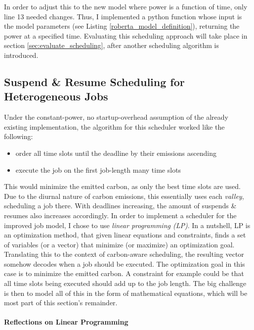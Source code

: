 In order to adjust this to the new model where power is a function of time, only line 13 needed changes. 
Thus, I implemented a python function whose input is the model parameters (see Listing \ref{roberta_model_definition}), returning the power at a specified time. 
Evaluating this scheduling approach will take place in section \ref{sec:evaluate_scheduling}, after another scheduling algorithm is introduced.

\subsection{{Suspend \& Resume Scheduling for Heterogeneous Jobs}} \label{sec:checkpoint_resume_lp}

Under the constant-power, no startup-overhead assumption of the already existing implementation, the algorithm for this scheduler worked like the following:

\begin{itemize}
    \item order all time slots until the deadline by their emissions ascending
    \item execute the job on the first job-length many time slots
\end{itemize}

This would minimize the emitted carbon, as only the best time slots are used.
Due to the diurnal nature of carbon emissions, this essentially uses each \emph{valley}, scheduling a job there. 
With deadlines increasing, the amount of suspends \& resumes also increases accordingly.
In order to implement a scheduler for the improved job model, I chose to use \emph{linear programming (LP)}.
In a nutshell, LP is an optimization method, that given linear equations and constraints, finds a set of variables (or a vector) that minimize (or maximize) an optimization goal.
Translating this to the context of carbon-aware scheduling, the resulting vector somehow decodes when a job should be executed.
The optimization goal in this case is to minimize the emitted carbon. 
A constraint for example could be that all time slots being executed should add up to the job length. 
The big challenge is then to model all of this in the form of mathematical equations, which will be most part of this section's remainder.

\paragraph{Reflections on Linear Programming}

